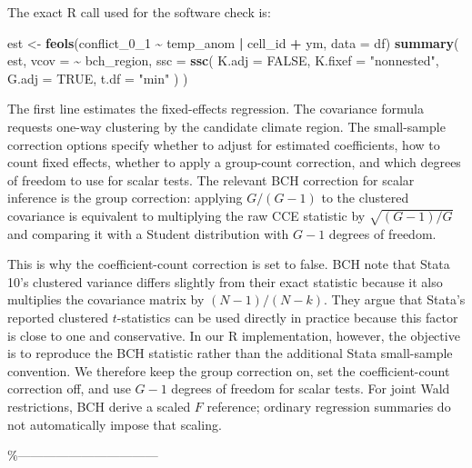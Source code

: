 \documentclass[
]{article}
\newenvironment{Shaded}{\begin{snugshade}}{\end{snugshade}}
\newcommand{\AttributeTok}[1]{\textcolor[rgb]{0.13,0.29,0.53}{#1}}
\newcommand{\ConstantTok}[1]{\textcolor[rgb]{0.56,0.35,0.01}{#1}}
\newcommand{\FunctionTok}[1]{\textcolor[rgb]{0.13,0.29,0.53}{\textbf{#1}}}
\newcommand{\NormalTok}[1]{#1}
\newcommand{\OtherTok}[1]{\textcolor[rgb]{0.56,0.35,0.01}{#1}}
\newcommand{\SpecialCharTok}[1]{\textcolor[rgb]{0.81,0.36,0.00}{\textbf{#1}}}
\newcommand{\StringTok}[1]{\textcolor[rgb]{0.31,0.60,0.02}{#1}}
\begin{document}
The exact R call used for the software check is:

\begin{Shaded}
\begin{Highlighting}[]
\NormalTok{est }\OtherTok{\textless{}{-}} \FunctionTok{feols}\NormalTok{(conflict\_0\_1 }\SpecialCharTok{\textasciitilde{}}\NormalTok{ temp\_anom }\SpecialCharTok{|}\NormalTok{ cell\_id }\SpecialCharTok{+}\NormalTok{ ym, }\AttributeTok{data =}\NormalTok{ df)}
\FunctionTok{summary}\NormalTok{(}
\NormalTok{  est,}
  \AttributeTok{vcov =} \SpecialCharTok{\textasciitilde{}}\NormalTok{ bch\_region,}
  \AttributeTok{ssc =} \FunctionTok{ssc}\NormalTok{(}
    \AttributeTok{K.adj =} \ConstantTok{FALSE}\NormalTok{,}
    \AttributeTok{K.fixef =} \StringTok{"nonnested"}\NormalTok{,}
    \AttributeTok{G.adj =} \ConstantTok{TRUE}\NormalTok{,}
    \AttributeTok{t.df =} \StringTok{"min"}
\NormalTok{  )}
\NormalTok{)}
\end{Highlighting}
\end{Shaded}

The first line estimates the fixed-effects regression. The covariance
formula requests one-way clustering by the candidate climate region. The
small-sample correction options specify whether to adjust for estimated
coefficients, how to count fixed effects, whether to apply a group-count
correction, and which degrees of freedom to use for scalar tests. The
relevant BCH correction for scalar inference is the group correction:
applying \(G/(G-1)\) to the clustered covariance is equivalent to
multiplying the raw CCE statistic by \(\sqrt{(G-1)/G}\) and comparing it
with a Student distribution with \(G-1\) degrees of freedom.

This is why the coefficient-count correction is set to false. BCH note
that Stata 10's clustered variance differs slightly from their exact
statistic because it also multiplies the covariance matrix by
\((N-1)/(N-k)\). They argue that Stata's reported clustered
\(t\)-statistics can be used directly in practice because this factor is
close to one and conservative. In our R implementation, however, the
objective is to reproduce the BCH statistic rather than the additional
Stata small-sample convention. We therefore keep the group correction
on, set the coefficient-count correction off, and use \(G-1\) degrees of
freedom for scalar tests. For joint Wald restrictions, BCH derive a
scaled \(F\) reference; ordinary regression summaries do not
automatically impose that scaling.

\%---------------------------------
\end{document}
